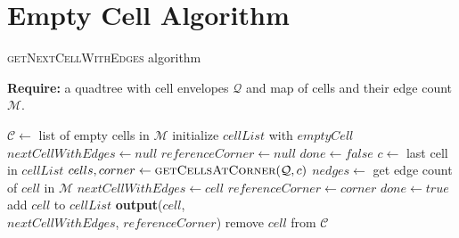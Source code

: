 \section{Empty Cell Algorithm}\label{app:emptycells}
\begin{algorithm}[!hb] \caption{\textsc{getNextCellWithEdges} algorithm}
    \textbf{Require:} a quadtree with cell envelopes $\mathcal Q$ and map of cells and their edge count $\mathcal M$.
    \begin{algorithmic}[1]
        \State $\mathcal C \gets $ list of empty cells in $\mathcal M$
            \State initialize $cellList$ with $emptyCell$ 
            \State $nextCellWithEdges \gets null$
            \State $referenceCorner \gets null$
            \State $done \gets false$
                \State $c \gets $ last cell in $cellList$ 
                \State $cells, corner \gets \textsc{getCellsAtCorner}(\mathcal Q, c)$ 
                    \State $nedges \gets$ get edge count of $cell$ in $\mathcal M$ 
                        \State $nextCellWithEdges \gets cell$
                        \State $referenceCorner \gets corner$
                        \State $done \gets true$
                    \Else
                        \State add $cell$ to $cellList$
                    \EndIf
                \EndFor
            \EndWhile
                \State \textbf{output}($cell$, \\
                \hspace{2.5cm} $nextCellWithEdges$, $referenceCorner$)
                \State remove $cell$ from $\mathcal C$
            \EndFor
        \EndFor
    \EndFunction
    \end{algorithmic}
\end{algorithm}

